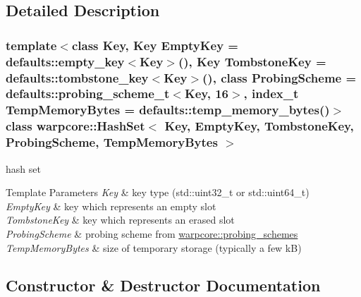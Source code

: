 \subsection{Detailed Description}
\subsubsection*{template$<$class Key, Key Empty\+Key = defaults\+::empty\+\_\+key$<$\+Key$>$(), Key Tombstone\+Key = defaults\+::tombstone\+\_\+key$<$\+Key$>$(), class Probing\+Scheme = defaults\+::probing\+\_\+scheme\+\_\+t$<$\+Key, 16$>$, index\+\_\+t Temp\+Memory\+Bytes = defaults\+::temp\+\_\+memory\+\_\+bytes()$>$\newline
class warpcore\+::\+Hash\+Set$<$ Key, Empty\+Key, Tombstone\+Key, Probing\+Scheme, Temp\+Memory\+Bytes $>$}

hash set 


\begin{DoxyTemplParams}{Template Parameters}
{\em Key} & key type ({\ttfamily std\+::uint32\+\_\+t} or {\ttfamily std\+::uint64\+\_\+t}) \\
\hline
{\em Empty\+Key} & key which represents an empty slot \\
\hline
{\em Tombstone\+Key} & key which represents an erased slot \\
\hline
{\em Probing\+Scheme} & probing scheme from {\ttfamily \hyperlink{namespacewarpcore_1_1probing__schemes}{warpcore\+::probing\+\_\+schemes}} \\
\hline
{\em Temp\+Memory\+Bytes} & size of temporary storage (typically a few kB) \\
\hline
\end{DoxyTemplParams}


\subsection{Constructor \& Destructor Documentation}
\mbox{\label{classwarpcore_1_1HashSet_aff2bcd0720090d1dcfc03d0e7d9a1eab}} 
